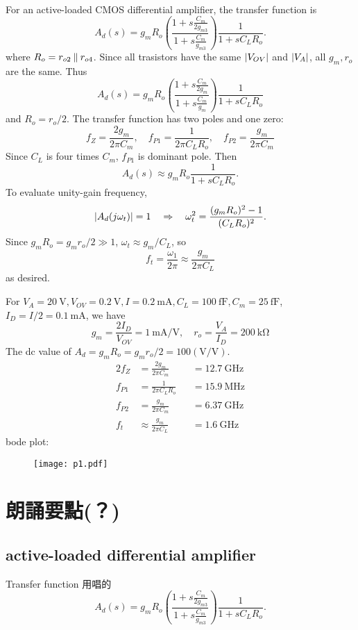 \documentclass[12pt, a4paper]{article}
\begin{document}
\Ans \\
For an active-loaded CMOS differential amplifier, the transfer function is
\[
  A_d(s) = g_mR_o\left(\frac{1+s\frac{C_m}{2g_{m3}}}{1+s\frac{C_m}{g_{m3}}}\right)
      \frac{1}{1+sC_LR_o}.
\]
where $R_o = r_{o2} \mathbin{\|} r_{o4}$.
Since all trasistors have the same $\lvert V_{OV}\rvert$ and $\lvert V_A\rvert$, all
$g_m, r_o$ are the same. Thus
\[
  A_d(s) = g_mR_o\left(\frac{1+s\frac{C_m}{2g_m}}{1+s\frac{C_m}{g_m}}\right)
      \frac{1}{1+sC_LR_o}
\]
and $R_o = r_o / 2$. The transfer function has two poles and one zero:
\[
  f_Z = \frac{2g_m}{2\pi C_m}, \quad
  f_{P1} = \frac{1}{2\pi C_LR_o}, \quad
  f_{P2} = \frac{g_m}{2\pi C_m}
\]
Since $C_L$ is four times $C_m$, $f_{P1}$ is dominant pole. Then
\[
  A_d(s) \approx g_mR_o \frac{1}{1+sC_LR_o}.
\]
To evaluate unity-gain frequency,
\[
  \lvert A_d(j\omega_t)\rvert = 1 \quad \Rightarrow \quad
  \omega_t^2 = \frac{(g_mR_o)^2 - 1}{(C_LR_o)^2}.
\]
Since $g_mR_o = g_mr_o/2 \gg 1$, $\omega_t \approx g_m/C_L$, so
\[
  f_t = \frac{\omega_1}{2\pi} \approx \frac{g_m}{2\pi C_L}
\]
as desired.

For $V_A=\SI{20}{\V}, V_{OV}=\SI{0.2}{\V}, I=\SI{0.2}{\mA},
C_L=\SI{100}{\fF},C_m=\SI{25}{\fF}$, $I_D = I/2=\SI{0.1}{\mA}$, we have
\[
  g_m = \frac{2I_D}{V_{OV}} = \SI{1}{\mA/\V}, \quad
  r_o = \frac{V_A}{I_D} = \SI{200}{\kohm}
\]
The dc value of $A_d = g_mR_o = g_mr_o/2 = 100(\si{\V/\V})$.
\begin{alignat*}{2}
  f_Z &= \frac{2g_m}{2\pi C_m} & &= \SI{12.7}{\GHz} \\
  f_{P1} &= \frac{1}{2\pi C_LR_o} & &= \SI{15.9}{\MHz} \\
  f_{P2} &= \frac{g_m}{2\pi C_m} & &= \SI{6.37}{\GHz} \\
  f_t &\approx \frac{g_m}{2\pi C_L} & &= \SI{1.6}{\GHz}
\end{alignat*}
bode plot:
\begin{figure}[H]
  \centering
  \texttt{[image: p1.pdf]}
\end{figure}

\section{朗誦要點(？)}
\subsection{active-loaded differential amplifier}
Transfer function 用唱的
\[
  A_d(s) = g_mR_o\left(\frac{1+s\frac{C_m}{2g_{m3}}}{1+s\frac{C_m}{g_{m3}}}\right)
      \frac{1}{1+sC_LR_o}.
\]
\end{document}
